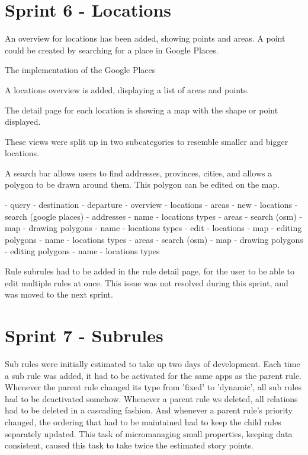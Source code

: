 %
\section{Sprint 6 - Locations}
An overview for locations has been added, showing points and areas. A point could be created by searching for a place in Google Places.

The implementation of the Google Places


A locations overview is added, displaying a list of areas and points.

The detail page for each location is showing a map with the shape or point displayed.

These views were split up in two subcategories to resemble smaller and bigger locations.

A search bar allows users to find addresses, provinces, cities, and allows a polygon to be drawn around them. This polygon can be edited on the map.

- query
	- destination
	- departure
- overview
	- locations
	- areas
- new
	- locations
		- search (google places)
		- addresses
		- name
		- locations types
	- areas
		- search (osm)
		- map
			- drawing polygons
		- name
		- locations types
- edit
	- locations
		- map
		  - editing polygons
		- name
		- locations types
	- areas
		- search (osm)
		- map
			- drawing polygons
			- editing polygons
		- name
		- locations types

Rule subrules had to be added in the rule detail page, for the user to be able to edit multiple rules at once. This issue was not resolved during this sprint, and was moved to the next sprint.

%
\section{Sprint 7 - Subrules}


Sub rules were initially estimated to take up two days of development. Each time a sub rule was added, it had to be activated for the same apps as the parent rule. Whenever the parent rule changed its type from 'fixed' to 'dynamic', all sub rules had to be deactivated somehow. Whenever a parent rule ws deleted, all relations had to be deleted in a cascading fashion. And whenever a parent rule's priority changed, the ordering that had to be maintained had to keep the child rules separately updated. This task of micromanaging small properties, keeping data consistent, caused this task to take twice the estimated story points.

